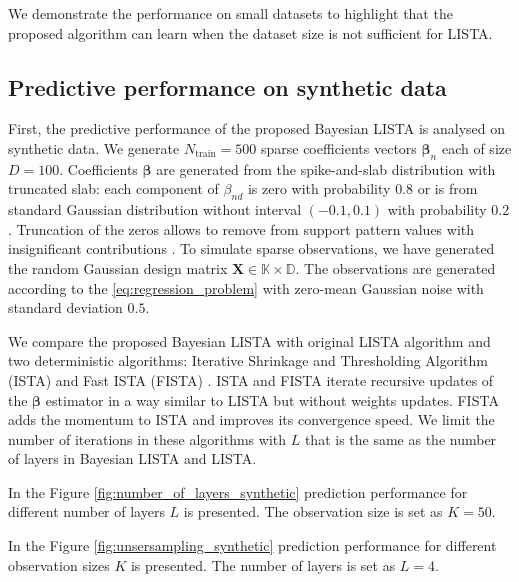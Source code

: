 \documentclass[letterpaper]{article}
\begin{document}
We demonstrate the performance on small datasets to highlight that the proposed algorithm can learn when the dataset size is not sufficient for LISTA.

\subsection{Predictive performance on synthetic data}
First, the predictive performance of the proposed Bayesian LISTA is analysed on synthetic data. We generate $N_\text{train}=500$ sparse coefficients vectors $\boldsymbol\beta_n$ each of size $D = 100$. Coefficients $\boldsymbol\beta$ are generated from the spike-and-slab distribution with truncated slab: each component of $\beta_{nd}$ is zero with probability $0.8$ or is from standard Gaussian distribution without interval $(-0.1, 0.1)$ with probability $0.2$. Truncation of the zeros allows to remove from support pattern values with insignificant contributions \cite{xin2016maximal}. To simulate sparse observations, we have generated the random Gaussian design matrix $\mathbf{X} \in \mathbb{K \times D}$.  The observations are generated according to the \ref{eq:regression_problem} with zero-mean Gaussian noise with standard deviation $0.5$. 

We compare the proposed Bayesian LISTA with original LISTA algorithm \cite{gregor2010learning} and two deterministic algorithms: Iterative Shrinkage and Thresholding Algorithm (ISTA) \cite{daubechies2004iterative} and Fast ISTA (FISTA) \cite{beck2009fast}. ISTA and FISTA iterate recursive updates of the $\boldsymbol\beta$ estimator in a way similar to LISTA but without weights updates.  FISTA adds the momentum to ISTA and improves its convergence speed. We limit the number of iterations in these algorithms with $L$ that is the same as the number of layers in Bayesian LISTA and LISTA.

In the Figure \ref{fig:number_of_layers_synthetic} prediction performance for different number of layers $L$ is presented. The observation size is set as $K=50$. 

In the Figure \ref{fig:unsersampling_synthetic} prediction performance for different observation sizes $K$ is presented. The number of layers is set as $L=4$.
\end{document}
